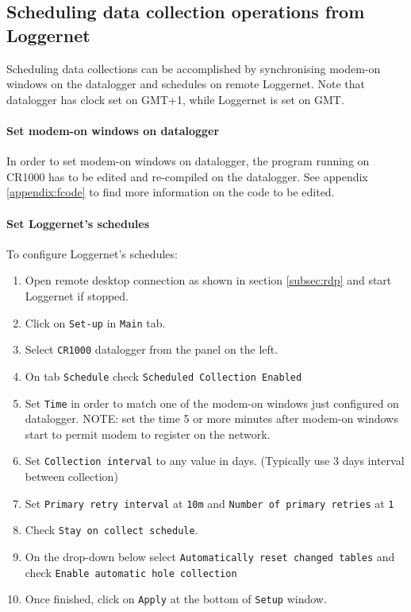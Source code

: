 \subsection{Scheduling data collection operations from Loggernet}
Scheduling data collections can be accomplished by synchronising modem-on windows on the datalogger
and schedules on remote Loggernet. Note that datalogger has clock set on GMT+1, while Loggernet is set on
GMT.
\paragraph{Set modem-on windows on datalogger}
In order to set modem-on windows on datalogger, the program running on CR1000 has to be edited and re-compiled
on the datalogger. See appendix \ref{appendix:fcode} to find more information on the code to be edited.
\paragraph{Set Loggernet's schedules}
To configure Loggernet's schedules:
\begin{enumerate}
	\item Open remote desktop connection as shown in section \ref{subsec:rdp} and start Loggernet if stopped.
	\item Click on {\tt Set-up} in {\tt Main} tab.
	\item Select {\tt CR1000} datalogger from the panel on the left.
	\item On tab {\tt Schedule} check {\tt Scheduled Collection Enabled}
	\item Set {\tt Time} in order to match one of the modem-on windows just configured on datalogger. NOTE: set the time 5 or more minutes after
		  modem-on windows start to permit modem to register on the network.
	\item Set {\tt Collection interval} to any value in days. (Typically use 3 days interval between collection)
	\item Set {\tt Primary retry interval} at {\tt 10m} and {\tt Number of primary retries} at {\tt 1}
	\item Check {\tt Stay on collect schedule}.
	\item On the drop-down below select {\tt Automatically reset changed tables} and check {\tt Enable automatic hole collection}
	\item Once finished, click on {\tt Apply} at the bottom of {\tt Setup} window.
\end{enumerate}
